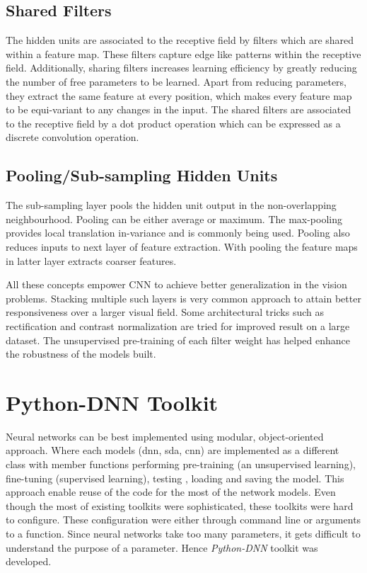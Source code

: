 \subsection{Shared Filters}
The hidden units are associated to the receptive field by filters which are shared within a feature map. These filters capture edge like patterns within the receptive field.  Additionally, sharing filters increases learning efficiency by greatly reducing the number of free parameters to be learned.  Apart from reducing parameters, they extract the same feature at every position, which makes every feature map to be equi-variant to any changes in the input.  The shared filters are associated to the receptive field by a dot product operation which can be expressed as a discrete convolution operation.
\subsection{Pooling/Sub-sampling Hidden Units}
The sub-sampling layer pools the hidden unit output in the non-overlapping neighbourhood.  Pooling can be either average or maximum.  The max-pooling provides local translation in-variance and is commonly being used.  Pooling also reduces inputs to next layer of feature extraction.  With pooling the feature maps in latter layer extracts coarser features.

\par All these concepts empower CNN to achieve better generalization in the vision problems.  Stacking multiple such layers is very common approach to attain better responsiveness over a larger visual field.  Some architectural tricks such as rectification and contrast normalization are tried for improved result on a large dataset.  The unsupervised pre-training of each filter weight has helped enhance the robustness of the models built.

\section{Python-DNN Toolkit}
\label{sec:pyDNN}
Neural networks can be best implemented using modular, object-oriented approach.  Where each models (dnn, sda, cnn) are implemented as a different class with member functions performing pre-training (an unsupervised learning), fine-tuning (supervised learning), testing , loading and saving the model.  This approach enable reuse of the code for the most of the network models.  Even though the most of existing toolkits were sophisticated, these toolkits were hard to configure. These configuration were either through command line or arguments to a function.  Since neural networks take too many parameters, it gets difficult to understand the purpose of a parameter.  Hence  \textit{Python-DNN} toolkit was developed.  
